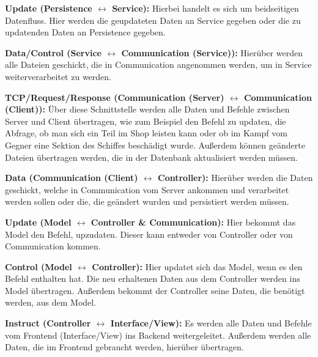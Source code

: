 \documentclass[fontsize=12pt,paper=a4,twoside]{scrartcl}
\begin{document}
\textbf{Update (Persistence $\leftrightarrow$ Service):}
Hierbei handelt es sich um beidseitigen Datenfluss. Hier werden die geupdateten Daten an Service gegeben oder die zu updatenden Daten an Persistence gegeben. 

\textbf{Data/Control (Service $\leftrightarrow$ Communication (Service)):}
Hierüber werden alle Dateien geschickt, die in Communication angenommen werden, um in Service weiterverarbeitet zu werden. 

\textbf{TCP/Request/Response (Communication (Server) $\leftrightarrow$ Communication (Client)):}
Über diese Schnittstelle werden alle Daten und Befehle zwischen Server und Client übertragen, wie zum Beispiel den Befehl zu updaten, die Abfrage, ob man sich ein Teil im Shop leisten kann oder ob im Kampf vom Gegner eine Sektion des Schiffes beschädigt wurde. Außerdem können geänderte Dateien übertragen werden, die in der Datenbank aktualisiert werden müssen. 

\textbf{Data (Communication (Client) $\leftrightarrow$ Controller):}
Hierüber werden die Daten geschickt, welche in Communication vom Server ankommen und verarbeitet werden sollen oder die, die geändert wurden und persistiert werden müssen. 

\textbf{Update (Model $\leftrightarrow$ Controller \& Communication):}
Hier bekommt das Model den Befehl, upzudaten. Dieser kann entweder von Controller oder von Communication kommen. 

\textbf{Control (Model $\leftrightarrow$ Controller):}
Hier updatet sich das Model, wenn es den Befehl enthalten hat. Die neu erhaltenen Daten aus dem Controller werden ins Model übertragen. Außerdem bekommt der Controller seine Daten, die benötigt werden, aus dem Model. 

\textbf{Instruct (Controller $\leftrightarrow$ Interface/View):}
Es werden alle Daten und Befehle vom Frontend (Interface/View) ins Backend weitergeleitet. Außerdem werden alle Daten, die im Frontend gebraucht werden, hierüber übertragen.
\end{document}
